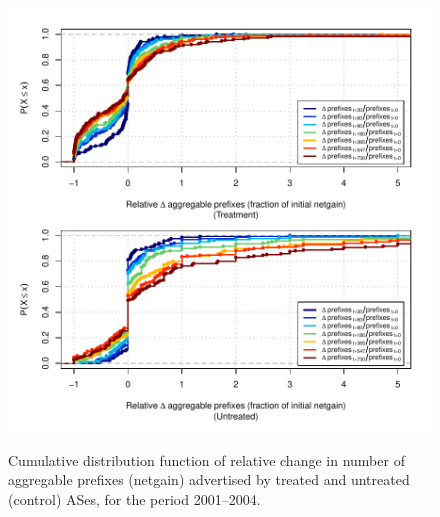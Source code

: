 \begin{figure}[H]
\begin{centering}
\begin{singlespace}
    \includegraphics[width=6in]{figures/behavior-rel_netgain-2001_2004-corr.pdf}
    \vspace{-2em}\\
    \caption{Cumulative distribution function of relative change in number of aggregable prefixes (netgain) advertised by treated and untreated (control) ASes, for the period 2001--2004.}
\end{singlespace}
\end{centering}
\end{figure}
